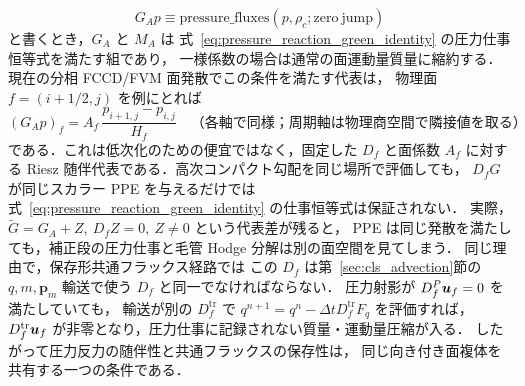\begin{equation}
  G_A p
  \equiv
  \mathrm{pressure\_fluxes}(p,\rho_c;\mathrm{zero\ jump})
  \label{eq:capillary_active_pressure_range_operator}
\end{equation}
と書くとき，$G_A$ と $M_A$ は
式~\eqref{eq:pressure_reaction_green_identity} の圧力仕事恒等式を満たす組であり，
一様係数の場合は通常の面運動量質量に縮約する．
現在の分相 FCCD/FVM 面発散でこの条件を満たす代表は，
物理面 $f=(i+1/2,j)$ を例にとれば
\begin{equation}
  (G_Ap)_f
  =
  A_f\,\frac{p_{i+1,j}-p_{i,j}}{H_f}
  \quad
  \text{（各軸で同様；周期軸は物理商空間で隣接値を取る）}
  \label{eq:variational_pressure_two_point_face}
\end{equation}
である．これは低次化のための便宜ではなく，固定した $D_f$ と面係数 $A_f$ に対する
Riesz 随伴代表である．高次コンパクト勾配を同じ場所で評価しても，
$D_fG$ が同じスカラー PPE を与えるだけでは式~\eqref{eq:pressure_reaction_green_identity}
の仕事恒等式は保証されない．
実際，$\widetilde G=G_A+Z,\ D_fZ=0,\ Z\ne0$ という代表差が残ると，
PPE は同じ発散を満たしても，補正段の圧力仕事と毛管 Hodge 分解は別の面空間を見てしまう．
同じ理由で，保存形共通フラックス経路では
この $D_f$ は第~\ref{sec:cls_advection}節の
$q,m,\bm{p}_m$ 輸送で使う $D_f$ と同一でなければならない．
圧力射影が $D_f^{P}\bm{u}_f=0$ を満たしていても，
輸送が別の $D_f^{\mathrm{tr}}$ で
$q^{n+1}=q^n-\Delta tD_f^{\mathrm{tr}}F_q$ を評価すれば，
$D_f^{\mathrm{tr}}\bm{u}_f$ が非零となり，圧力仕事に記録されない質量・運動量圧縮が入る．
したがって圧力反力の随伴性と共通フラックスの保存性は，
同じ向き付き面複体を共有する一つの条件である．

